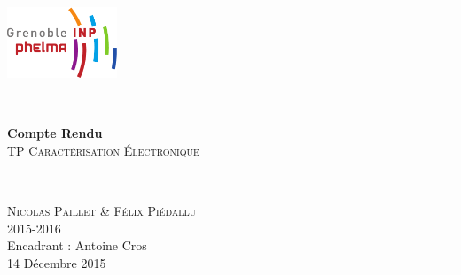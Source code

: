 \begin{titlepage}
    \vspace*{-10px}
    \includegraphics[height=80px]{logo_phelma.pdf}
    \vspace*{-80px}
\begin{flushright}
    \vspace*{60px}
\end{flushright}

\vspace*{0.5cm}
\begin{center}
\rule{\linewidth}{0.5mm}\\[0.4cm]
{\huge{\bfseries Compte Rendu}\\[0.4cm]
\textsc{TP Caractérisation Électronique}\\[0.4cm]}
\rule{\linewidth}{0.5mm}\\[0.5cm]

\LARGE{\textsc{Nicolas Paillet \& Félix Piédallu}}\\[0.7cm]
\large{\textsc{2015-2016}}\\[2cm]

\large{Encadrant : Antoine Cros}\\[1cm]

\large{14 Décembre 2015}\\[2cm]


\end{center}
\end{titlepage}

\tableofcontents        %
\newpage
{}  %

